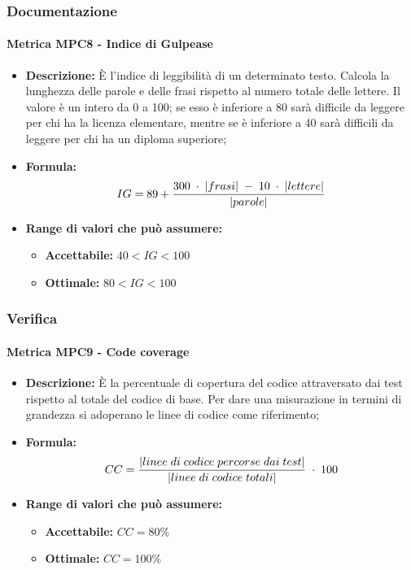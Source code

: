 \subsubsection{Documentazione}
    \paragraph{Metrica MPC8 - Indice di Gulpease}
    \begin{itemize}
        \item \textbf{Descrizione:} È l'indice di leggibilità di un determinato testo. Calcola la lunghezza delle parole e delle frasi rispetto al numero totale delle lettere. Il valore è un intero da 0 a 100; se esso è inferiore a 80 sarà difficile da leggere per chi ha la licenza elementare, mentre se è inferiore a 40 sarà difficili da leggere per chi ha un diploma superiore;
        \item \textbf{Formula:} $$IG = 89 + {{300 \; \cdot \; |frasi| \; - \; 10 \; \cdot \; |lettere|}\over |parole|}$$
        \item \textbf{Range di valori che può assumere:}
        \begin{itemize}
            \item \textbf{Accettabile:} $40 < IG < 100$
            \item \textbf{Ottimale:} $80 < IG < 100$
        \end{itemize}
    \end{itemize}

\subsubsection{Verifica}
    \paragraph{Metrica MPC9 - Code coverage}
    \begin{itemize}
        \item \textbf{Descrizione:} È la percentuale di copertura del codice attraversato dai test rispetto al totale del codice di base. Per dare una misurazione in termini di grandezza si adoperano le linee di codice come riferimento;
        \item \textbf{Formula:} $$CC = {|linee \; di \; codice \; percorse \; dai  \; test| \over |linee \; di \; codice \; totali|} \; \cdot \; 100$$
        \item \textbf{Range di valori che può assumere:}
        \begin{itemize}
            \item \textbf{Accettabile:} $CC = 80\%$
            \item \textbf{Ottimale:} $CC = 100\%$
        \end{itemize}
    \end{itemize}

